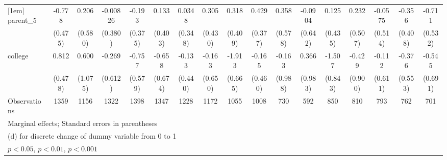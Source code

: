{\begin{tabular}{l*{16}{c}}
[1em]
parent\_5            &      -0.778         &       0.206         &    -0.00826         &      -0.193         &       0.133         &      0.0348         &       0.305         &       0.318         &       0.429         &       0.358         &     -0.0904         &       0.125         &       0.232         &     -0.0575         &      -0.356         &      -0.711         \\
                    &     (0.475)         &     (0.580)         &     (0.380)         &     (0.375)         &     (0.403)         &     (0.348)         &     (0.430)         &     (0.409)         &     (0.377)         &     (0.578)         &     (0.642)         &     (0.435)         &     (0.507)         &     (0.514)         &     (0.408)         &     (0.532)         \\
[1em]
college             &       0.812         &       0.600         &      -0.269         &      -0.757         &      -0.658         &      -0.133         &      -0.163         &      -1.913\sym{**} &      -0.165         &      -0.163         &       0.366         &      -1.507         &      -0.429         &      -0.112         &      -0.376         &      -0.545         \\
                    &     (0.478)         &     (1.075)         &     (0.612)         &     (0.579)         &     (0.674)         &     (0.440)         &     (0.650)         &     (0.665)         &     (0.460)         &     (0.988)         &     (0.983)         &     (0.843)         &     (0.900)         &     (0.611)         &     (0.553)         &     (0.691)         \\
\hline
Observations        &        1359         &        1156         &        1322         &        1398         &        1347         &        1228         &        1172         &        1055         &        1008         &         730         &         592         &         850         &         810         &         793         &         762         &         701         \\
\hline\hline
\multicolumn{17}{l}{\footnotesize Marginal effects; Standard errors in parentheses}\\
\multicolumn{17}{l}{\footnotesize  (d) for discrete change of dummy variable from 0 to 1}\\
\multicolumn{17}{l}{\footnotesize \sym{*} \(p<0.05\), \sym{**} \(p<0.01\), \sym{***} \(p<0.001\)}\\
\end{tabular}
}
